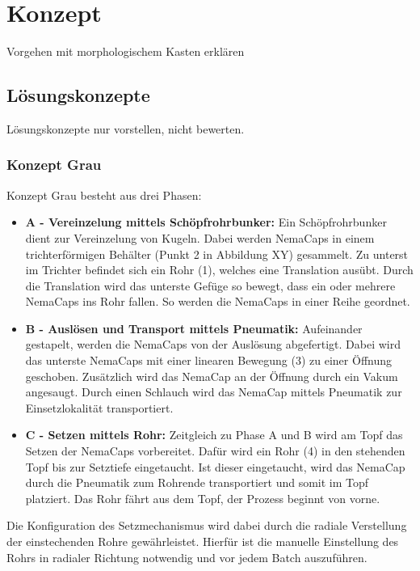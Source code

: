\newpage
\section{Konzept}
Vorgehen mit morphologischem Kasten erklären

\subsection{Lösungskonzepte}
Lösungskonzepte nur vorstellen, nicht bewerten.

\subsubsection{Konzept Grau}
Konzept Grau besteht aus drei Phasen:
\begin{itemize}
	\item \textbf{A - Vereinzelung mittels Schöpfrohrbunker:}
	Ein Schöpfrohrbunker dient zur Vereinzelung von Kugeln. Dabei werden NemaCaps in einem trichterförmigen Behälter (Punkt 2 in Abbildung XY) gesammelt. Zu unterst im Trichter befindet sich ein Rohr (1), welches eine Translation ausübt. Durch die Translation wird das unterste Gefüge so bewegt, dass ein oder mehrere NemaCaps ins Rohr fallen. So werden die NemaCaps in einer Reihe geordnet.
	
	\item \textbf{B - Auslösen und Transport mittels Pneumatik:}
	Aufeinander gestapelt, werden die NemaCaps von der Auslösung abgefertigt. Dabei wird das unterste NemaCaps mit einer linearen Bewegung (3) zu einer Öffnung geschoben. Zusätzlich wird das NemaCap an der Öffnung durch ein Vakum angesaugt. Durch einen Schlauch wird das NemaCap mittels Pneumatik zur Einsetzlokalität transportiert. 
	
	\item \textbf{C - Setzen mittels Rohr:}
	Zeitgleich zu Phase A und B wird am Topf das Setzen der NemaCaps vorbereitet. Dafür wird ein Rohr (4) in den stehenden Topf bis zur Setztiefe eingetaucht. Ist dieser eingetaucht, wird das NemaCap durch die Pneumatik zum Rohrende transportiert und somit im Topf platziert. Das Rohr fährt aus dem Topf, der Prozess beginnt von vorne.
\end{itemize}

Die Konfiguration des Setzmechanismus wird dabei durch die radiale Verstellung der einstechenden Rohre gewährleistet. Hierfür ist die manuelle Einstellung des Rohrs in radialer Richtung notwendig und vor jedem Batch auszuführen.

